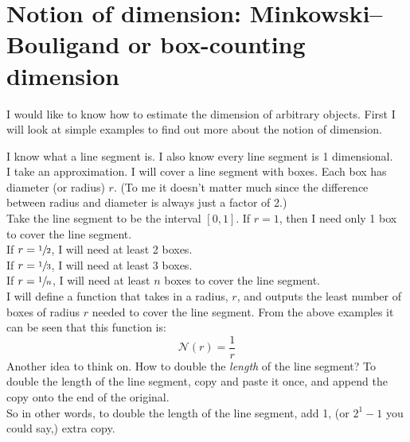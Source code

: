 \documentclass[11pt]{ekblite}
\begin{document}
\section{Notion of dimension: Minkowski–Bouligand or box-counting dimension}
I would like to know how to estimate the dimension of arbitrary objects. First I will look at simple examples to find out more about the notion of dimension.
\begin{example}
	I know what a line segment is. I also know every line segment is 1 dimensional.
	\\[0.2in]I take an approximation. I will cover a line segment with boxes. Each box has diameter (or radius) $r$. (To me it doesn't matter much since the difference between radius and diameter is always just a factor of 2.)
	\\[0.2in]Take the line segment to be the interval $[0,1]$. If $r = 1$, then I need only 1 box to cover the line segment.
	\\[0.2in]If $r = \sfrac{1}{2}$, I will need at least 2 boxes.
	\\[0.2in]If $r = \sfrac{1}{3}$, I will need at least 3 boxes.
	\\[0.2in]If $r = \sfrac{1}{n}$, I will need at least $n$ boxes to cover the line segment.
	\\[0.2in]I will define a function that takes in a radius, $r$, and outputs the least number of boxes of radius $r$ needed to cover the line segment. From the above examples it can be seen that this function is:
	\[\mathcal{N}(r) = \frac{1}{r}\]
	Another idea to think on. How to double the \textit{length} of the line segment? To double the length of the line segment, copy and paste it once, and append the copy onto the end of the original. 
	\\[0.2in]So in other words, to double the length of the line segment, add 1, (or $2^1 - 1$ you could say,) extra copy.
\end{example}
\end{document}
